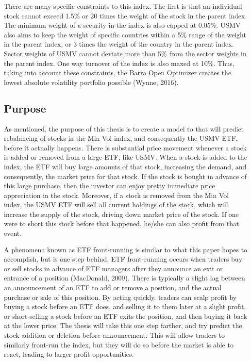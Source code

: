 \documentclass[12pt,twoside]{reedthesis}
\theoremstyle{definition}
\theoremstyle{definition}
\theoremstyle{definition}
\theoremstyle{remark}
\begin{document}
There are many specific constraints to this index. The first is that an
individual stock cannot exceed 1.5\% or 20 times the weight of the stock
in the parent index. The minimum weight of a security in the index is
also capped at 0.05\%. USMV also aims to keep the weight of specific
countries within a 5\% range of the weight in the parent index, or 3
times the weight of the country in the parent index. Sector weights of
USMV cannot deviate more than 5\% from the sector weights in the parent
index. One way turnover of the index is also maxed at 10\%. Thus, taking
into account these constraints, the Barra Open Optimizer creates the
lowest absolute volatility portfolio possible (Wynne, 2016).

\subsection{Purpose}\label{purpose}

As mentioned, the purpose of this thesis is to create a model to that
will predict rebalancing of stocks in the Min Vol index, and
consequently the USMV ETF, before it actually happens. There is
substantial price movement whenever a stock is added or removed from a
large ETF, like USMV. When a stock is added to the index, the ETF will
buy large amounts of that stock, increasing the demand, and
consequently, the market price for that stock. If the stock is bought in
advance of this large purchase, then the investor can enjoy pretty
immediate price appreciation in the stock. Moreover, if a stock is
removed from the Min Vol index, the USMV ETF will sell all current
holdings of the stock, which will increase the supply of the stock,
driving down market price of the stock. If one were to short this stock
before that happened, he/she can also profit from that event.

A phenomena known as ETF front-running is similar to what this paper
hopes to accomplish, but is one step behind. ETF front-running occurs
when traders buy or sell stocks in advance of ETF managers after they
announce an exit or entrance of a position (MacDonald, 2009). There is
typically a slight lag between an announcement of an ETF to add or
remove a position, and the actual purchase or sale of this position. By
acting quickly, traders can scalp profit by buying a stock before an ETF
does, and selling it to them later at a slight profit, or short-selling
a stock before an ETF exits the position, and then buying it back at the
lower price. The thesis will take this one step farther, and try predict
the stock addition or deletion before announcement. This will allow
traders to similarly front-run the index, but they will do so before the
market is able to react, leading to larger profit opportunities.
\end{document}
